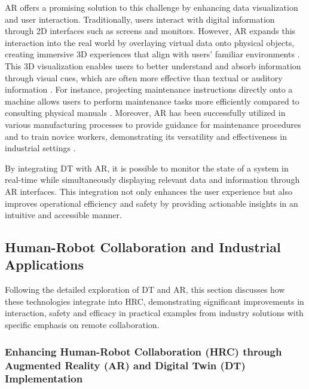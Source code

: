 \ac{AR} offers a promising solution to this challenge by enhancing data visualization and user interaction. Traditionally, users interact with digital 
information through 2D interfaces such as screens and monitors. However, \ac{AR} expands this interaction into the real world by overlaying virtual 
data onto physical objects, creating immersive 3D experiences that align with users' familiar environments \cite{peddie2017augmented}. This 3D visualization enables
users to better understand and absorb information through visual cues, which are often more effective than textual or auditory information \cite{article-teaching}.
For instance, projecting maintenance instructions directly onto a machine allows users to perform maintenance tasks more efficiently compared to 
consulting physical manuals \cite{inproceedings}. Moreover, \ac{AR} has been successfully utilized in various manufacturing processes to provide guidance 
for maintenance procedures and to train novice workers, demonstrating its versatility and effectiveness in industrial settings \cite{ong2004virtual}.

By integrating \ac{DT} with \ac{AR}, it is possible to monitor the state of a system in real-time while simultaneously displaying relevant
data and information through \ac{AR} interfaces. This integration not only enhances the user experience but also improves operational efficiency and 
safety by providing actionable insights in an intuitive and accessible manner.

\subsection{Human-Robot Collaboration and Industrial Applications}
Following the detailed exploration of \ac{DT} and \ac{AR}, this section discusses how these technologies integrate into \ac{HRC}, demonstrating significant improvements in interaction, safety and efficacy in practical examples from industry solutions with specific emphasis on remote collaboration.

\subsubsection{Enhancing Human-Robot Collaboration (\ac{HRC}) through Augmented Reality (\ac{AR}) and Digital Twin (\ac{DT}) Implementation}

